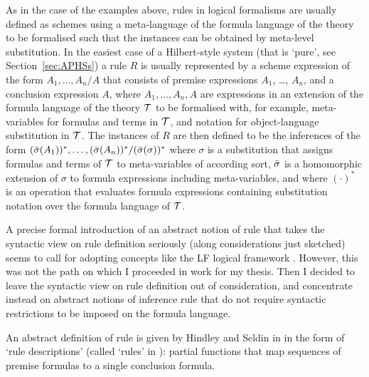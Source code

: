 \documentclass[envcountsame,runningheads]{llncs}
\newcommand{\funap}[2]{#1(#2)}
\newcommand{\arule}{R}
\newcommand{\asubst}{\sigma}
\newcommand{\atheory}{{\cal T}}
\begin{document}
As in the case of the examples above, rules in logical formalisms are
usually defined as schemes using a meta-language of the formula language
of the theory to be formalised such that the instances can be obtained
by meta-level substitution. 
In the easiest case of a Hilbert-style system (that is `pure', 
see Section~\ref{sec:APHSs}) a rule $\arule$ is usually represented by a
scheme expression of the form $A_1, \ldots, A_n / A$ that consists of 
premise expressions $A_1$, \ldots, $A_n$, and a conclusion expression
$A$, where $A_1, \ldots, A_n, A$ are expressions in an extension
of the formula language of the theory $\atheory$ to be formalised
with, for example, meta-variables for formulas and terms in $\atheory$,
and notation for object-language substitution in $\atheory$.  
The instances of $\arule$ are then defined to be the inferences 
of the form
$ (\funap{\Bar{\asubst}}{A_1})^*, \ldots, (\funap{\Bar{\asubst}}{A_n})^* /
  (\funap{\Bar{\asubst}}{\asubst})^* $
where $\asubst$ is a substitution 
that assigns formulas and terms of $\atheory$ 
to meta-variables of according sort,
$\Bar{\asubst}$ is a homomorphic extension of $\asubst$ to 
formula expressions including meta-variables,
and where $(\cdot)^*$ is an operation that evaluates formula expressions
containing substitution notation over the formula language of $\atheory$.


A precise formal introduction of an abstract notion of rule
that takes the syntactic view on rule definition seriously 
(along considerations just sketched)
seems to call for adopting concepts like the LF logical framework
\cite{harp:hons:plot}.
However, this was not the path on which I proceeded in work for
my thesis. Then I decided to leave the syntactic view on rule
definition out of consideration, and concentrate instead
on abstract notions of inference rule that do not require
syntactic restrictions to be imposed on the formula language. 

An abstract definition of rule is given by Hindley and Seldin
in \cite{hind:seld:1986}
in the form of `rule descriptions' 
(called `rules' in \cite{hind:seld:1986}):
partial functions that map sequences of premise formulas
to a single conclusion formula.
\end{document}

